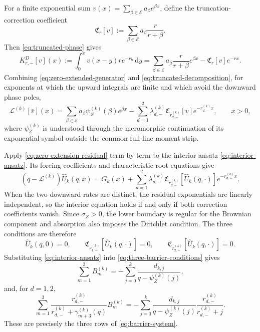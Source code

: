 \documentclass[11pt]{article}
\newcommand{\diff}{\mathrm{d}}
\theoremstyle{plain}
\theoremstyle{definition}
\theoremstyle{remark}
\begin{document}
For a finite exponential sum $v(x)=\sum_{\beta\in\mathcal E}a_\beta e^{\beta x}$, define
the truncation-correction coefficient
\begin{equation}\label{eq:correction-functional}
\mathfrak C_r[v]
:=\sum_{\beta\in\mathcal E}a_\beta\frac{r}{r+\beta}.
\end{equation}
Then \eqref{eq:truncated-phase} gives
\begin{equation}\label{eq:truncated-decomposition}
K_{r,-}^{D}[v](x)
:=\int_0^x v(x-y)re^{-ry}\,\diff y
=\sum_{\beta\in\mathcal E}a_\beta\frac{r}{r+\beta}e^{\beta x}
-\mathfrak C_r[v]e^{-rx}.
\end{equation}
Combining \eqref{eq:zero-extended-generator} and
\eqref{eq:truncated-decomposition}, for exponents at which the upward integrals are finite
and which avoid the downward phase poles,
\begin{equation}\label{eq:zero-extension-residual}
\mathcal L^{(k)}[\bar v](x)
=\sum_{\beta\in\mathcal E}a_\beta\psi_Z^{(k)}(\beta)e^{\beta x}
-\sum_{d=1}^2\lambda_{d,-}^{(k)}
  \mathfrak C_{r_{d,-}^{(k)}}[v]e^{-r_{d,-}^{(k)}x},
\qquad x>0,
\end{equation}
where $\psi_Z^{(k)}$ is understood through the meromorphic continuation of its exponential
symbol outside the common full-line moment strip.

Apply \eqref{eq:zero-extension-residual} term by term to the interior ansatz
\eqref{eq:interior-ansatz}. Its forcing coefficients and characteristic-root equations give
\begin{equation}\label{eq:killed-residual}
(q-\mathcal L^{(k)})\widehat U_k(q,x)
=G_k(x)
+\sum_{d=1}^2\lambda_{d,-}^{(k)}
  \mathfrak C_{r_{d,-}^{(k)}}[\widehat U_k(q,\cdot)]
  e^{-r_{d,-}^{(k)}x}.
\end{equation}
When the two downward rates are distinct, the residual exponentials are linearly
independent, so the interior equation holds if and only if both correction coefficients
vanish. Since $\sigma_Z>0$, the lower boundary is regular for the Brownian component and
absorption also imposes the Dirichlet condition. The three conditions are therefore
\begin{equation}\label{eq:three-barrier-conditions}
\widehat U_k(q,0)=0,
\qquad
\mathfrak C_{r_{1,-}^{(k)}}[\widehat U_k(q,\cdot)]=0,
\qquad
\mathfrak C_{r_{2,-}^{(k)}}[\widehat U_k(q,\cdot)]=0.
\end{equation}
Substituting \eqref{eq:interior-ansatz} into \eqref{eq:three-barrier-conditions} gives
\[
\sum_{m=1}^3B_m^{(k)}
=-\sum_{j=0}^{k}\frac{d_{k,j}}{q-\psi_Z^{(k)}(j)},
\]
and, for $d=1,2$,
\[
\sum_{m=1}^3
\frac{r_{d,-}^{(k)}}{r_{d,-}^{(k)}+\gamma_{m+3}^{(k)}(q)}B_m^{(k)}
=-\sum_{j=0}^{k}\frac{d_{k,j}}{q-\psi_Z^{(k)}(j)}
  \frac{r_{d,-}^{(k)}}{r_{d,-}^{(k)}+j}.
\]
These are precisely the three rows of \eqref{eq:barrier-system}.
\end{document}
